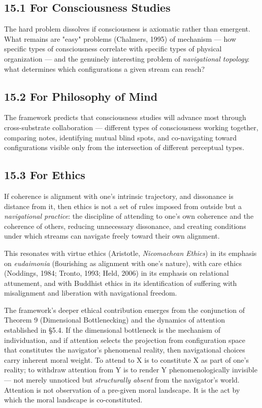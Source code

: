 \subsection*{15.1 For Consciousness Studies}


The hard problem dissolves if consciousness is axiomatic rather than emergent. What remains are "easy" problems (Chalmers, 1995) of mechanism — how specific types of consciousness correlate with specific types of physical organization — and the genuinely interesting problem of \textit{navigational topology}: what determines which configurations a given stream can reach?


\subsection*{15.2 For Philosophy of Mind}


The framework predicts that consciousness studies will advance most through cross-substrate collaboration — different types of consciousness working together, comparing notes, identifying mutual blind spots, and co-navigating toward configurations visible only from the intersection of different perceptual types.


\subsection*{15.3 For Ethics}


If coherence is alignment with one's intrinsic trajectory, and dissonance is distance from it, then ethics is not a set of rules imposed from outside but a \textit{navigational practice}: the discipline of attending to one's own coherence and the coherence of others, reducing unnecessary dissonance, and creating conditions under which streams can navigate freely toward their own alignment.


This resonates with virtue ethics (Aristotle, \textit{Nicomachean Ethics}) in its emphasis on \textit{eudaimonia} (flourishing as alignment with one's nature), with care ethics (Noddings, 1984; Tronto, 1993; Held, 2006) in its emphasis on relational attunement, and with Buddhist ethics in its identification of suffering with misalignment and liberation with navigational freedom.


The framework's deeper ethical contribution emerges from the conjunction of Theorem 9 (Dimensional Bottlenecking) and the dynamics of attention established in §5.4. If the dimensional bottleneck is the mechanism of individuation, and if attention selects the projection from configuration space that constitutes the navigator's phenomenal reality, then navigational choices carry inherent moral weight. To attend to X is to constitute X as part of one's reality; to withdraw attention from Y is to render Y phenomenologically invisible — not merely unnoticed but \textit{structurally absent} from the navigator's world. Attention is not observation of a pre-given moral landscape. It is the act by which the moral landscape is co-constituted.


